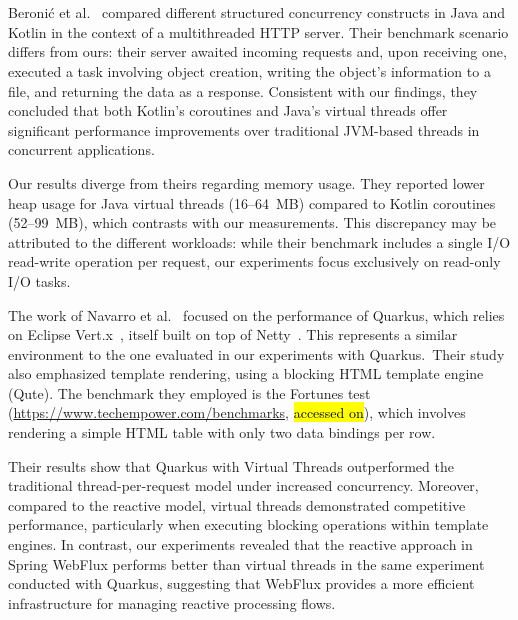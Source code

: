 \documentclass[software,article,accept,pdftex,moreauthors]{Definitions/mdpi}
\begin{document}
\section{ %
}\label{s6}

Beronić et al.~\cite{9803765} compared different structured concurrency
constructs in Java and Kotlin in the context of a multithreaded HTTP server.
Their benchmark scenario differs from ours: their server awaited incoming
requests and, upon receiving one, executed a task involving object creation,
writing the object's information to a file, and returning the data as a
response. Consistent with our findings, they concluded that both Kotlin's
coroutines and Java's virtual threads offer significant performance
improvements over traditional JVM-based threads in concurrent applications.

Our results diverge from theirs regarding memory usage. They reported lower
heap usage for Java virtual threads (16–64~MB) compared to Kotlin coroutines
(52–99~MB), which contrasts with our measurements. This discrepancy may be
attributed to the different workloads: while their benchmark includes a single
I/O read-write operation per request, our experiments focus exclusively on
read-only I/O tasks.

The work of Navarro et al.~\cite{navarro2023considerations} focused on the
performance of Quarkus, which relies on Eclipse Vert.x~\cite{vertx}, itself
built on top of Netty~\cite{netty}. This represents a similar environment to
the one evaluated in our experiments with Quarkus.~Their study also emphasized
template rendering, using a blocking HTML template engine (Qute). The benchmark
they employed is the Fortunes
test ({\url{https://www.techempower.com/benchmarks}}, \hl{accessed on}), which involves
rendering a simple HTML table with only two data bindings per row.

Their results show that Quarkus with Virtual Threads outperformed the
traditional thread-per-request model under increased concurrency. Moreover,
compared to the reactive model, virtual threads demonstrated competitive
performance, particularly when executing blocking operations within template
engines.
In contrast, our experiments revealed that the reactive approach in Spring
WebFlux performs better than virtual threads in the same experiment conducted
with Quarkus, suggesting that WebFlux provides a more efficient infrastructure
for managing reactive processing flows.
\end{document}
